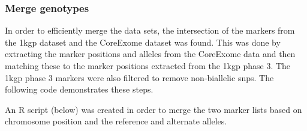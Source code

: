\documentclass[]{report}
\newenvironment{Shaded}{\begin{snugshade}}{\end{snugshade}}
\newcommand{\StringTok}[1]{\textcolor[rgb]{0.31,0.60,0.02}{#1}}
\newcommand{\CommentTok}[1]{\textcolor[rgb]{0.56,0.35,0.01}{\textit{#1}}}
\newcommand{\FunctionTok}[1]{\textcolor[rgb]{0.00,0.00,0.00}{#1}}
\newcommand{\VariableTok}[1]{\textcolor[rgb]{0.00,0.00,0.00}{#1}}
\newcommand{\ExtensionTok}[1]{#1}
\newcommand{\NormalTok}[1]{#1}
\begin{document}
\subsubsection{Merge genotypes}\label{merge-genotypes}

In order to efficiently merge the data sets, the intersection of the
markers from the \gls{1kgp} dataset and the CoreExome dataset was found.
This was done by extracting the marker positions and alleles from the
CoreExome data and then matching these to the marker positions extracted
from the \gls{1kgp} phase 3. The \gls{1kgp} phase 3 markers were also
filtered to remove non-biallelic \glspl{snp}. The following code
demonstrates these steps.

\begin{Shaded}
\end{Shaded}

An R script (below) was created in order to merge the two marker lists
based on chromosome position and the reference and alternate alleles.
\end{document}
